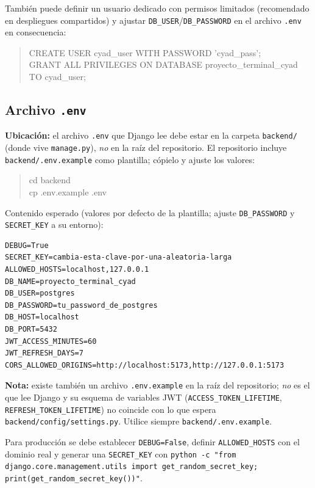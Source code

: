 \documentclass{computacion}
\begin{document}
También puede definir un usuario dedicado con permisos limitados (recomendado en despliegues compartidos) y ajustar \texttt{DB\_USER}/\texttt{DB\_PASSWORD} en el archivo \texttt{.env} en consecuencia:

\begin{quote}
\ttfamily
CREATE USER cyad\_user WITH PASSWORD 'cyad\_pass'; \\
GRANT ALL PRIVILEGES ON DATABASE proyecto\_terminal\_cyad TO cyad\_user;
\end{quote}

\subsection{Archivo \texttt{.env}}

\textbf{Ubicación:} el archivo \texttt{.env} que Django lee debe estar en la carpeta \texttt{backend/} (donde vive \texttt{manage.py}), \emph{no} en la raíz del repositorio. El repositorio incluye \texttt{backend/.env.example} como plantilla; cópielo y ajuste los valores:

\begin{quote}
\ttfamily
cd backend \\
cp .env.example .env
\end{quote}

Contenido esperado (valores por defecto de la plantilla; ajuste \texttt{DB\_PASSWORD} y \texttt{SECRET\_KEY} a su entorno):

\begin{Verbatim}[fontsize=\small, frame=single]
DEBUG=True
SECRET_KEY=cambia-esta-clave-por-una-aleatoria-larga
ALLOWED_HOSTS=localhost,127.0.0.1
DB_NAME=proyecto_terminal_cyad
DB_USER=postgres
DB_PASSWORD=tu_password_de_postgres
DB_HOST=localhost
DB_PORT=5432
JWT_ACCESS_MINUTES=60
JWT_REFRESH_DAYS=7
CORS_ALLOWED_ORIGINS=http://localhost:5173,http://127.0.0.1:5173
\end{Verbatim}

\textbf{Nota:} existe también un archivo \texttt{.env.example} en la raíz del repositorio; \emph{no} es el que lee Django y su esquema de variables JWT (\texttt{ACCESS\_TOKEN\_LIFETIME}, \texttt{REFRESH\_TOKEN\_LIFETIME}) no coincide con lo que espera \texttt{backend/config/settings.py}. Utilice siempre \texttt{backend/.env.example}.

Para producción se debe establecer \texttt{DEBUG=False}, definir \texttt{ALLOWED\_HOSTS} con el dominio real y generar una \texttt{SECRET\_KEY} con \texttt{python -c "from django.core.management.utils import get\_random\_secret\_key; print(get\_random\_secret\_key())"}.
\end{document}
